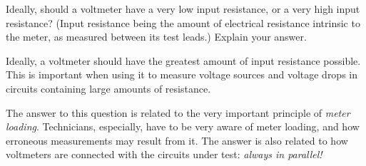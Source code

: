 

Ideally, should a voltmeter have a very low input resistance, or a very high input resistance?  (Input resistance being the amount of electrical resistance intrinsic to the meter, as measured between its test leads.)  Explain your answer.







Ideally, a voltmeter should have the greatest amount of input resistance possible.  This is important when using it to measure voltage sources and voltage drops in circuits containing large amounts of resistance.







The answer to this question is related to the very important principle of {\it meter loading}.  Technicians, especially, have to be very aware of meter loading, and how erroneous measurements may result from it.  The answer is also related to how voltmeters are connected with the circuits under test: {\it always in parallel!}




